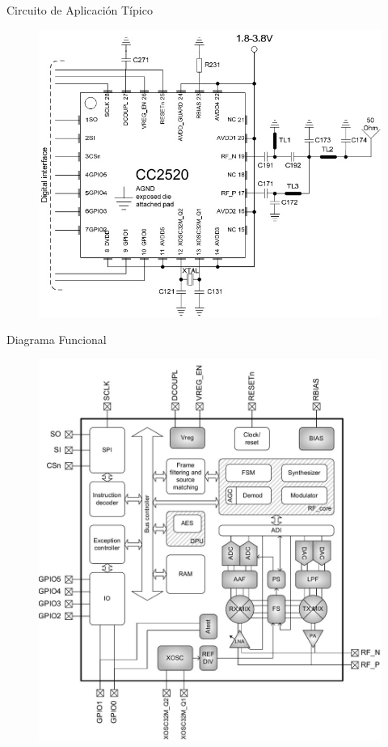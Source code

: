 \documentclass[aspectratio=169]{beamer}
\begin{document}
\begin{frame}{Circuito de Aplicación Típico}	
	\begin{figure}[H]
		\includegraphics[height=1\textheight]{./imagenes/applicationcircuit.jpg}
	\end{figure}	
\end{frame}

\begin{frame}{Diagrama Funcional}
	\begin{figure}[H]
		\includegraphics[height=1\textheight]{./imagenes/diagrama.jpg}
	\end{figure}	
\end{frame}
\end{document}

